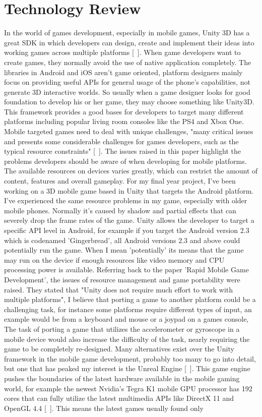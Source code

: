 \chapter{Technology Review}
In the world of games development, especially in mobile games, Unity 3D has a great SDK in which developers can design, create and implement their ideas into working games across multiple platforms [~\cite{Unity3D}]. When game developers want to create games, they normally avoid the use of native application completely. The libraries in Android and iOS aren't game oriented, platform designers mainly focus on providing useful APIs for general usage of the phone's capabilities, not generate 3D interactive worlds. So usually when a game designer looks for good foundation to develop his or her game, they may choose something like Unity3D. This framework provides a good bases for developers to target many different platforms including popular living room consoles like the PS4 and Xbox One. Mobile targeted games need to deal with unique challenges, "many critical issues and presents some considerable challenges for games developers, such as the typical resource constraints" [~\cite{RAD-Game-Development}]. The issues raised in this paper highlight the problems developers should be aware of when developing for mobile platforms. The available resources on devices varies greatly, which can restrict the amount of content, features and overall gameplay. For my final year project, I've been working on a 3D mobile game based in Unity that targets the Android platform. I've experienced the same resource problems in my game, especially with older mobile phones. Normally it’s caused by shadow and partial effects that can severely drop the frame rates of the game. Unity allows the developer to target a specific API level in Android, for example if you target the Android version 2.3 which is codenamed 'Gingerbread', all Android versions 2.3 and above could potentially run the game. When I mean 'potentially' its means that the game may run on the device if enough resources like video memory and CPU processing power is available. Referring back to the paper 'Rapid Mobile Game Development', the issues of resource management and game portability were raised. They stated that "Unity does not require much effort to work with multiple platforms", I believe that porting a game to another platform could be a challenging task, for instance some platforms require different types of input, an example would be from a keyboard and mouse or a joypad on a games console, The task of porting a game that utilizes the accelerometer or gyroscope in a mobile device would also increase the difficulty of the task, nearly requiring the game to be completely re-designed. Many alternatives exist over the Unity framework in the mobile game development, probably too many to go into detail, but one that has peaked my interest is the Unreal Engine [~\cite{Unreal-Engine}]. This game engine pushes the boundaries of the latest hardware available in the mobile gaming world, for example the newest Nvidia’s Tegra K1 mobile GPU processor has 192 cores that can fully utilize the latest multimedia APIs like DirectX 11 and OpenGL 4.4 [~\cite{Nvidia-K1}]. This means the latest games usually found only 